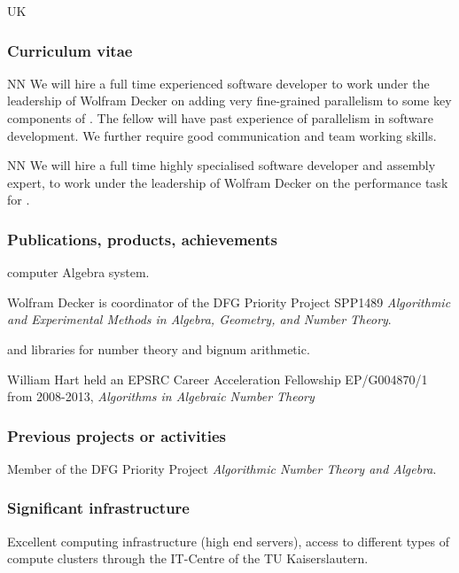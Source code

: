 \begin{sitedescription}{UK}
\subsubsection*{Curriculum vitae}


%

\begin{participant}[type=res,PM=48]{NN}
We will hire a full time experienced software developer to work
  under the leadership of Wolfram Decker on adding very fine-grained 
  parallelism to some key components of \Singular. The fellow
  will have past experience of parallelism in software development.
  We further require good communication and team working
  skills.
\end{participant}

\begin{participant}[type=res,PM=12]{NN}
  We will hire a full time highly specialised software developer and
  assembly expert, to work under the leadership of Wolfram Decker on the
  performance task  for \MPIR.
\end{participant}

\subsubsection*{Publications, products, achievements}

\begin{compactenum}
\item \Singular computer Algebra system.
\item Wolfram Decker is coordinator of the DFG Priority Project SPP1489 \emph{Algorithmic and Experimental Methods in Algebra, Geometry, and
Number Theory}.
\item {} and \MPIR {} libraries for number theory and bignum arithmetic.
\item William Hart held an EPSRC Career Acceleration Fellowship EP/G004870/1 
from 2008-2013, \emph{Algorithms in Algebraic Number Theory}
\end{compactenum}

\subsubsection*{Previous projects or activities}

\begin{compactenum}
\item Member of the DFG Priority Project \emph{Algorithmic Number Theory and Algebra}.
\end{compactenum}

\subsubsection*{Significant infrastructure}

Excellent computing infrastructure (high end servers), access to 
different types of compute clusters through the IT-Centre of the 
TU Kaiserslautern.
\end{sitedescription}



